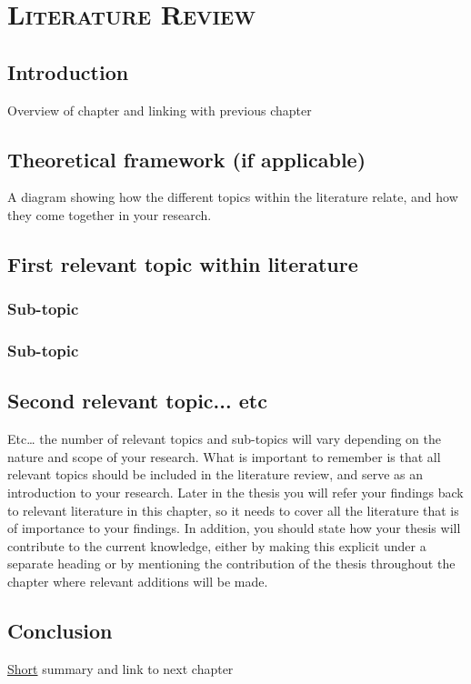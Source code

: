%
%
% 
% 

\chapter{\textsc{Literature Review}}
\label{chap:theory}

\section{Introduction}
\label{sec:introcap2}

Overview of chapter and linking with previous chapter

\section{Theoretical framework (if applicable)}
\label{sec:theoreticalframework}

A diagram showing how the different topics within the literature relate, and how they come together in your research.

\section{First relevant topic within literature}
\label{sec:rel1}

\subsection{Sub-topic}
\label{sec:rel1sub1}

\subsection{Sub-topic}
\label{sec:rel1sub2}


\section{Second relevant topic... etc}
\label{sec:rel2}

Etc… the number of relevant topics and sub-topics will vary depending on the nature and scope of your research. What is important to remember is that all relevant topics should be included in the literature review, and serve as an introduction to your research. Later in the thesis you will refer your findings back to relevant literature in this chapter, so it needs to cover all the literature that is of importance to your findings. 
In addition, you should state how your thesis will contribute to the current knowledge, either by making this explicit under a separate heading or by mentioning the contribution of the thesis throughout the chapter where relevant additions will be made. 

\section{Conclusion}

\underline{Short} summary and link to next chapter

